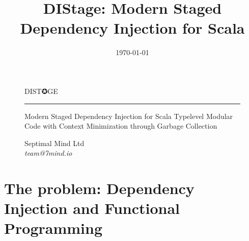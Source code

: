 \documentclass[usenames,dvipsnames]{beamer}
\title[DIStage]{DIStage: Modern Staged Dependency Injection for Scala}
\institute[Septimal Mind Ltd]
    {
    Septimal Mind Ltd\\
    \medskip
    \textit{team@7mind.io}
    }
\date{\today}
\begin{document}

\begin{frame}
\begin{figure}
\Huge 
\color{RubineRed} DIST✪GE
\noindent
\rule{\linewidth}{1mm}
\Large Modern Staged Dependency Injection for Scala
\normalsize Type\-level Modular Code with Context Minimization through Garbage Collection
\end{figure}

\begin{figure}
\Large Septimal Mind Ltd \\
\medskip
\textit{team@7mind.io}
\end{figure}

\end{frame}


\section{The problem: Dependency Injection and Functional Programming}
\end{document}
